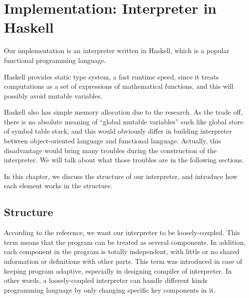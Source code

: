 \chapter{Implementation: Interpreter in Haskell}
Our implementation is an interpreter written in Haskell, which is a popular functional  programming language. 

Haskell provides static type system, a fast runtime speed, since it treats computations as a set of expressions of mathematical functions,  and this will possibly avoid mutable variables. 

Haskell also has simple memory allocation due to the research\cite{PIH}. As the trade off, there is no absolute meaning of ``global mutable variables'' such like global store of symbol table stack, and this would obviously differ in building interpreter between object-oriented language and functional language. Actually, this disadvantage would bring many troubles during the construction of the interpreter. We will talk about what those troubles are in the following sections.


In this chapter, we discuss the structure of our interpreter, and introduce how each element works in the structure.

\section{Structure}
According to the reference\cite{WCAI}, we want our interpreter to be loosely-coupled\cite{looseC}. This term means that the program can be treated as several components. In addition, each component in the program is totally independent, with little or no shared information or definitions with other parts.
This term was introduced in case of keeping program adaptive, especially in designing compiler of interpreter. In other words, a loosely-coupled interpreter can handle different kinds programming language by only changing specific key components in it.

